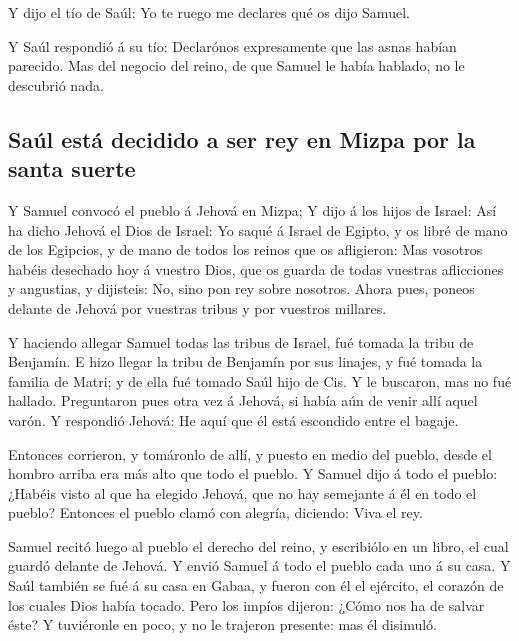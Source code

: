  Y dijo el tío de Saúl: Yo te ruego me declares qué os dijo
Samuel.

 Y Saúl respondió á su tío: Declarónos expresamente que las
asnas habían parecido. Mas del negocio del reino, de que Samuel le había
hablado, no le descubrió nada.

\hypertarget{sauxfal-estuxe1-decidido-a-ser-rey-en-mizpa-por-la-santa-suerte}{%
\subsection{Saúl está decidido a ser rey en Mizpa por la santa
suerte}\label{sauxfal-estuxe1-decidido-a-ser-rey-en-mizpa-por-la-santa-suerte}}

 Y Samuel convocó el pueblo á Jehová en Mizpa;
 Y dijo á los hijos de Israel: Así ha dicho Jehová el Dios
de Israel: Yo saqué á Israel de Egipto, y os libré de mano de los
Egipcios, y de mano de todos los reinos que os afligieron: 
Mas vosotros habéis desechado hoy á vuestro Dios, que os guarda de todas
vuestras aflicciones y angustias, y dijisteis: No, sino pon rey sobre
nosotros. Ahora pues, poneos delante de Jehová por vuestras tribus y por
vuestros millares.

 Y haciendo allegar Samuel todas las tribus de Israel, fué
tomada la tribu de Benjamín.  E hizo llegar la tribu de
Benjamín por sus linajes, y fué tomada la familia de Matri; y de ella
fué tomado Saúl hijo de Cis. Y le buscaron, mas no fué hallado.
 Preguntaron pues otra vez á Jehová, si había aún de venir
allí aquel varón. Y respondió Jehová: He aquí que él está escondido
entre el bagaje.

 Entonces corrieron, y tomáronlo de allí, y puesto en medio
del pueblo, desde el hombro arriba era más alto que todo el pueblo.
 Y Samuel dijo á todo el pueblo: ¿Habéis visto al que ha
elegido Jehová, que no hay semejante á él en todo el pueblo? Entonces el
pueblo clamó con alegría, diciendo: Viva el rey.

 Samuel recitó luego al pueblo el derecho del reino, y
escribiólo en un libro, el cual guardó delante de Jehová. 
Y envió Samuel á todo el pueblo cada uno á su casa. Y Saúl también se
fué á su casa en Gabaa, y fueron con él el ejército, el corazón de los
cuales Dios había tocado.  Pero los impíos dijeron: ¿Cómo
nos ha de salvar éste? Y tuviéronle en poco, y no le trajeron presente:
mas él disimuló.

